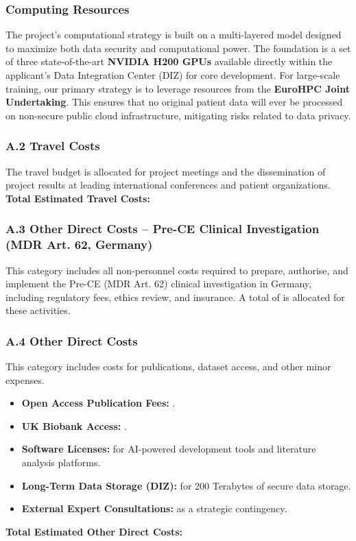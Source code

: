 \documentclass[11pt, a4paper]{article}
\begin{document}
\subsubsection*{Computing Resources}
The project's computational strategy is built on a multi-layered model designed to maximize both data security and computational power. The foundation is a set of three state-of-the-art \textbf{NVIDIA H200 GPUs} available directly within the applicant's Data Integration Center (DIZ) for core development. For large-scale training, our primary strategy is to leverage resources from the \textbf{EuroHPC Joint Undertaking}. This ensures that no original patient data will ever be processed on non-secure public cloud infrastructure, mitigating risks related to data privacy.

\subsubsection*{A.2 Travel Costs}
The travel budget is allocated for project meetings and the dissemination of project results at leading international conferences and patient organizations.
\textbf{Total Estimated Travel Costs: }

\subsubsection*{A.3 Other Direct Costs – Pre-CE Clinical Investigation (MDR Art. 62, Germany)}
This category includes all non-personnel costs required to prepare, authorise, and implement the Pre-CE (MDR Art. 62) clinical investigation in Germany, including regulatory fees, ethics review, and insurance. A total of \textbf{} is allocated for these activities.

\subsubsection*{A.4 Other Direct Costs}
This category includes costs for publications, dataset access, and other minor expenses.
\begin{itemize}
    \item \textbf{Open Access Publication Fees:} .
    \item \textbf{UK Biobank Access:} .
    \item \textbf{Software Licenses:}  for AI-powered development tools and literature analysis platforms.
    \item \textbf{Long-Term Data Storage (DIZ):}  for 200 Terabytes of secure data storage.
    \item \textbf{External Expert Consultations:}  as a strategic contingency.
\end{itemize}
\textbf{Total Estimated Other Direct Costs: }
\end{document}
